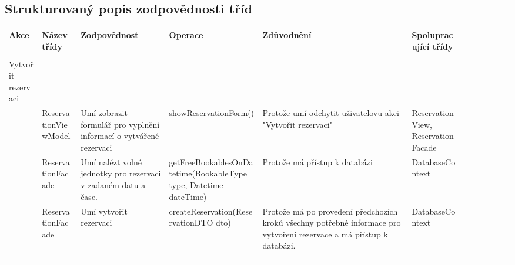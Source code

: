 \newpage
\begin{landscape}
\section*{Strukturovaný popis zodpovědnosti tříd}

\begin{longtable}{ Lp{2cm} | Lp{3.5cm} | Lp{3cm} | Lp{4cm} | Lp{4cm} | Lp{4cm} }
  	
    \textbf{Akce} & 
      \textbf{Název třídy} & \textbf{Zodpovědnost} & \textbf{Operace} & \textbf{Zdůvodnění} & \textbf{Spolupracující třídy} \\
    
    & & & & & \\
    Vytvořit rezervaci & & & & & \\
    \hline
  
    & ReservationViewModel & Umí zobrazit formulář pro vyplnění informací o vytvářené rezervaci & showReservationForm() & Protože umí odchytit uživatelovu akci "Vytvořit rezervaci" & ReservationView, ReservationFacade \\
    & ReservationFacade & Umí nalézt volné jednotky pro rezervaci v zadaném datu a čase. & getFreeBookablesOnDatetime(BookableType type, Datetime dateTime) & Protože má přístup k databázi & DatabaseContext \\
    & ReservationFacade & Umí vytvořit rezervaci & createReservation(ReservationDTO dto) & Protože má po provedení předchozích kroků všechny potřebné informace pro vytvoření rezervace a má přístup k databázi. & DatabaseContext \\
    
    & & & & & \\
    & & & & & \\
    
    
    
    \hline
\end{longtable}

\end{landscape}
